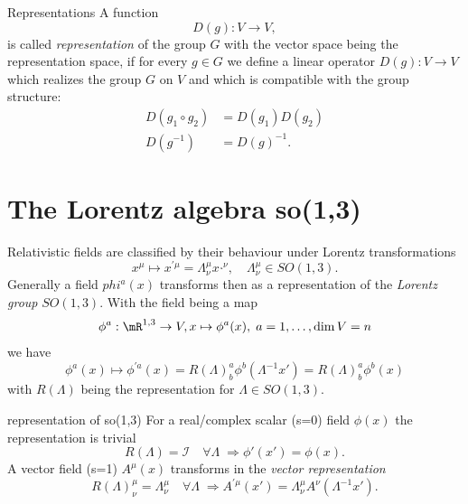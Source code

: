 \begin{mybox}{Representations}
	A function 
	\begin{equation}
		D(g) : V \rightarrow V,
	\end{equation}
	is called \emph{representation} of the group $G$ with the vector space being the representation space, if for every $g\in G$ we define a linear operator $D(g):V\rightarrow V$ which realizes the group $G$ on $V$ and which is compatible with the group structure:
	\begin{align}
		D(g_1 \circ g_2) &= D(g_1) D(g_2) \\
		D(g^{-1}) &= D(g)^{-1}.
	\end{align}
	
\end{mybox}


\newpage
\section{The Lorentz algebra so(1,3)}
Relativistic fields are classified by their behaviour under Lorentz transformations
\begin{equation}
x^{\mu} \mapsto x^{' \mu} = \Lambda^{\mu}_{\nu} x^{¸\nu}, \quad \Lambda^{\mu}_{\nu} \in SO(1,3).
\end{equation}
Generally a field $phi^a(x)$ transforms then as a representation of the \emph{Lorentz group} $SO(1,3)$. With the field being a map
\begin{equation}
	\phi^a :\mR^{1,3} \rightarrow V, x\mapsto \phi^a(x), \; a=1,\dots, \dim V=n
\end{equation}
we have
\begin{equation}
	\phi^a(x) \mapsto \phi^{'a} (x) = R(\Lambda)^a_b \phi^b (\Lambda^{-1} x') = R(\Lambda)^a_b \phi^b(x)
\end{equation}
with $R(\Lambda)$ being the representation for $\Lambda \in SO(1,3)$.
\begin{mybox}{representation of so(1,3)}
	For a real/complex scalar (s=0) field $\phi(x)$ the representation is trivial 
	\begin{equation}
		R(\Lambda) = \mathcal{I} \quad \forall \Lambda \; \Rightarrow \phi'(x')=\phi(x).
	\end{equation}
	A vector field (s=1) $A^{\mu}(x)$ transforms in the \emph{vector representation} 
	\begin{equation}
		R(\Lambda)^{\mu}_{\nu } = \Lambda^{\mu}_{\nu} \quad \forall \Lambda \; \Rightarrow A^{'\mu}(x') = \Lambda^{\mu}_{\nu} A^{\nu}(\Lambda^{-1}x' ).
	\end{equation}
\end{mybox}

